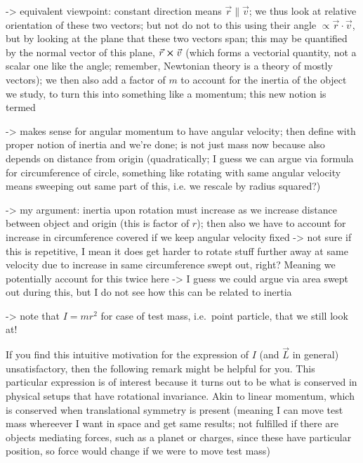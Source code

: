 \documentclass[../class_mech_main.tex]{subfiles}
\begin{document}
-> equivalent viewpoint: constant direction means $\vec{r} \parallel \vec{v}$; we thus look at relative orientation of these two vectors; but not do not to this using their angle $\propto \vec{r} \cdot \vec{v}$, but by looking at the plane that these two vectors span; this may be quantified by the normal vector of this plane, $\vec{r} \cross \vec{v}$ (which forms a vectorial quantity, not a scalar one like the angle; remember, Newtonian theory is a theory of mostly vectors); we then also add a factor of $m$ to account for the inertia of the object we study, to turn this into something like a momentum; this new notion is termed 



-> makes sense for angular momentum to have angular velocity; then define with proper notion of inertia and we're done; is not just mass now because also depends on distance from origin (quadratically; I guess we can argue via formula for circumference of circle, something like rotating with same angular velocity means sweeping out same part of this, i.e. we rescale by radius squared?)

-> my argument: inertia upon rotation must increase as we increase distance between object and origin (this is factor of $r$); then also we have to account for increase in circumference covered if we keep angular velocity fixed -> not sure if this is repetitive, I mean it does get harder to rotate stuff further away at same velocity due to increase in same circumference swept out, right? Meaning we potentially account for this twice here -> I guess we could argue via area swept out during this, but I do not see how this can be related to inertia

-> note that $I = m r^2$ for case of test mass, i.e.~point particle, that we still look at!


If you find this intuitive motivation for the expression of $I$ (and $\vec{L}$ in general) unsatisfactory, then the following remark might be helpful for you. This particular expression is of interest because it turns out to be what is conserved in physical setups that have rotational invariance. Akin to linear momentum, which is conserved when translational symmetry is present (meaning I can move test mass whereever I want in space and get same results; not fulfilled if there are objects mediating forces, such as a planet or charges, since these have particular position, so force would change if we were to move test mass)
\end{document}
